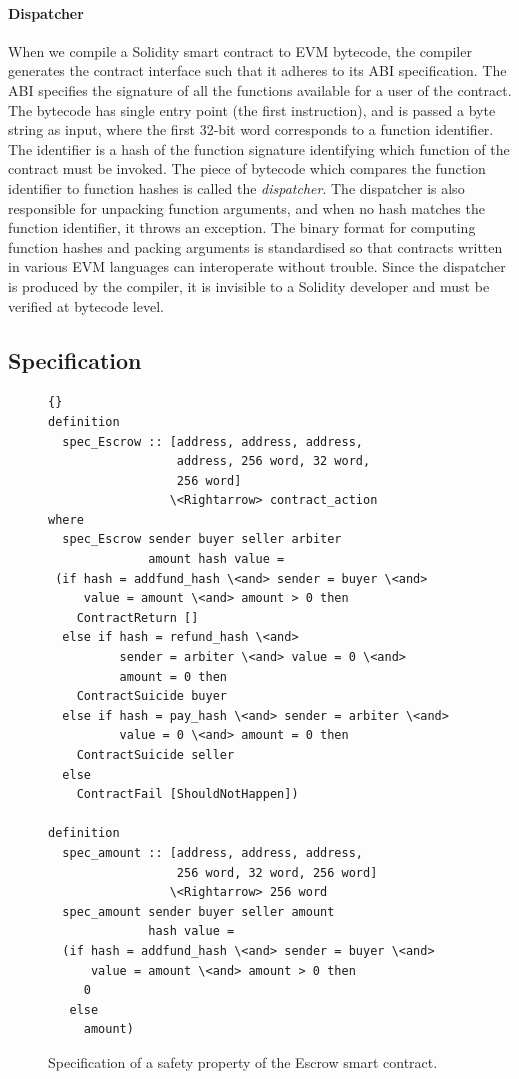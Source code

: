 \documentclass[sigplan,10pt]{acmart}\settopmatter{printfolios=true,printccs=false,printacmref=false}
\begin{document}
\paragraph{Dispatcher}
%
When we compile a Solidity smart contract to EVM bytecode,
the compiler generates the contract interface
such that it adheres to its ABI specification.
The ABI specifies the signature of all the functions
available for a user of the contract.
The bytecode has single entry point (the first instruction),
and is passed a byte string as input, where the
first 32-bit word corresponds to a function identifier.
The identifier is a hash of the function signature
identifying which function of the contract must be invoked.
The piece of bytecode which compares the function identifier
to function hashes is called the \textit{dispatcher}.
The dispatcher is also responsible for unpacking function
arguments, and when no hash matches the function identifier,
it throws an exception.
The binary format for computing function hashes and
packing arguments is standardised so that contracts
written in various EVM languages can interoperate without
trouble.
Since the dispatcher is produced by the compiler, it is
invisible to a Solidity developer and must be verified at
bytecode level.

\subsection{Specification}
\label{sec:spec}

\begin{figure}[h]
\begin{lstlisting}[language=Isar]{}
definition 
  spec_Escrow :: [address, address, address,
                  address, 256 word, 32 word,
                  256 word]
                 \<Rightarrow> contract_action
where
  spec_Escrow sender buyer seller arbiter
              amount hash value =
 (if hash = addfund_hash \<and> sender = buyer \<and>
     value = amount \<and> amount > 0 then
    ContractReturn []
  else if hash = refund_hash \<and>
          sender = arbiter \<and> value = 0 \<and>
          amount = 0 then
    ContractSuicide buyer
  else if hash = pay_hash \<and> sender = arbiter \<and>
          value = 0 \<and> amount = 0 then
    ContractSuicide seller
  else
    ContractFail [ShouldNotHappen])

definition
  spec_amount :: [address, address, address,
                  256 word, 32 word, 256 word]
                 \<Rightarrow> 256 word
  spec_amount sender buyer seller amount
              hash value =
  (if hash = addfund_hash \<and> sender = buyer \<and>
      value = amount \<and> amount > 0 then
     0
   else
     amount)
\end{lstlisting}
\caption{Specification of a safety property of the Escrow smart contract.}
\label{spec}
\end{figure}
\end{document}
